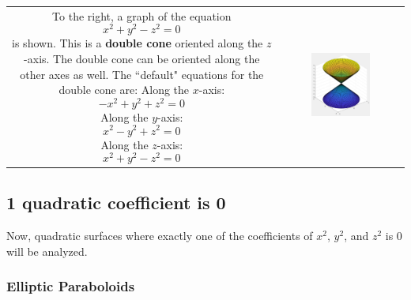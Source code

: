 \documentclass{article}
\begin{document}
\begin{tabular}{cc}
\parbox{0.5\textwidth}{
To the right, a graph of the equation 
\[x^2 + y^2 - z^2 = 0\]
is shown. This is a {\bf double cone} oriented along the \(z\)-axis. The double cone can be oriented along the other axes as well. The ``default" equations for the double cone are: \\
Along the \(x\)-axis:
\[-x^2 + y^2 + z^2 = 0\]
Along the \(y\)-axis:
\[x^2 - y^2 + z^2 = 0\]
Along the \(z\)-axis:
\[x^2 + y^2 - z^2 = 0\]
} & \parbox{0.5\textwidth}{
\includegraphics[width = 0.5\textwidth]{cones.png}
}
\end{tabular}



\subsection*{1 quadratic coefficient is 0}

Now, quadratic surfaces where exactly one of the coefficients of \(x^2\), \(y^2\), and \(z^2\) is \(0\) will be analyzed.


\subsubsection*{Elliptic Paraboloids}
\end{document}
